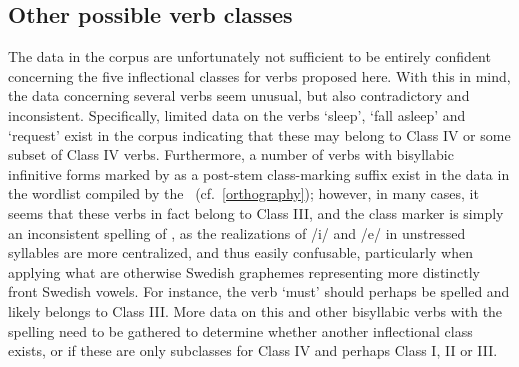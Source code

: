 \subsection{Other possible verb classes}\label{otherVerbClasses}
The data in the corpus are unfortunately not sufficient to be entirely confident concerning the five inflectional classes for verbs proposed here. With this in mind, the data concerning several verbs seem unusual, but also contradictory and inconsistent. Specifically, limited data on the verbs  ‘sleep’,  ‘fall asleep’  %
and  ‘request’ %
exist in the corpus indicating that these may belong to Class IV or some subset of Class IV verbs. Furthermore, a number of verbs with bisyllabic infinitive forms marked by  as a post-stem class-marking suffix exist in the data in the wordlist compiled by the \WLP\ (cf.~\SEC\ref{orthography}); however, in many cases, it seems that these verbs in fact belong to Class III, and the  class marker is simply an inconsistent spelling of , as the realizations of /i/ and /e/ in unstressed syllables are more centralized, and thus easily confusable, particularly when applying what are otherwise Swedish graphemes representing more distinctly front Swedish vowels. For instance, the verb  ‘must’ should perhaps be spelled  and likely belongs to Class III. More data on this and other bisyllabic verbs with the  spelling need to be gathered to determine whether another inflectional class exists, or if these are only subclasses for Class IV and perhaps Class I, II or III. 



